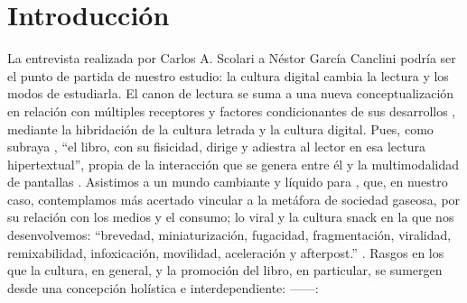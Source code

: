 \documentclass[spanish]{textolivre}
\begin{document}
\section{Introducción}\label{sec-intro}
La entrevista realizada por Carlos A. Scolari a Néstor García Canclini \cite{scolari2020cultura} %
podría ser el punto de partida de nuestro estudio: la cultura digital cambia la lectura y los modos de estudiarla. El canon de lectura se suma a una nueva conceptualización en relación con múltiples receptores y factores condicionantes de sus desarrollos \cite{ezquerro2022comunicacion}, %
mediante la hibridación de la cultura letrada y la cultura digital. Pues, como subraya \cite[p.37]{tabernero2022formar}, “el libro, con su fisicidad, dirige y adiestra al lector en esa lectura hipertextual”, propia de la interacción que se genera entre él y la multimodalidad de pantallas \cite{landow2015bueno}. Asistimos a un mundo cambiante y líquido para \textcite{bauman2019}, %
que, en nuestro caso, contemplamos más acertado vincular a la metáfora de \textcite{scolari2021} %
sociedad gaseosa, por su relación con los medios y el consumo; lo viral y la cultura snack en la que nos desenvolvemos: “brevedad, miniaturización, fugacidad, fragmentación, viralidad, remixabilidad, infoxicación, movilidad, aceleración y afterpost.” \cite[p. 157]{scolari2021}. %
Rasgos en los que la cultura, en general, y la promoción del libro, en particular, se sumergen desde una concepción holística e interdependiente: ——:
\end{document}
